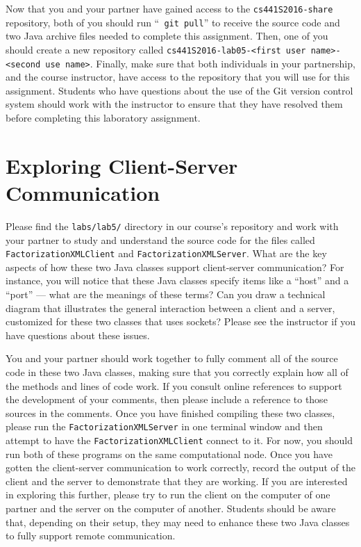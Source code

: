 Now that you and your partner have gained access to the {\tt cs441S2016-share} repository, both of you should run ``{\tt
git pull}'' to receive the source code and two Java archive files needed to complete this assignment. Then, one of you
should create a new repository called {\tt cs441S2016-lab05-<first user name>-<second use name>}. Finally, make sure
that both individuals in your partnership, and the course instructor, have access to the repository that you will use
for this assignment. Students who have questions about the use of the Git version control system should work with the
instructor to ensure that they have resolved them before completing this laboratory assignment.

\section*{Exploring Client-Server Communication}

Please find the {\tt labs/lab5/} directory in our course's repository and work with your partner to study and understand
the source code for the files called {\tt FactorizationXMLClient} and {\tt FactorizationXMLServer}. What are the
key aspects of how these two Java classes support client-server communication? For instance, you will notice that these
Java classes specify items like a ``host'' and a ``port'' --- what are the meanings of these terms? Can you draw a
technical diagram that illustrates the general interaction between a client and a server, customized for these two
classes that uses sockets? Please see the instructor if you have questions about these issues.

You and your partner should work together to fully comment all of the source code in these two Java classes, making sure
that you correctly explain how all of the methods and lines of code work. If you consult online references to support
the development of your comments, then please include a reference to those sources in the comments. Once you have
finished compiling these two classes, please run the {\tt FactorizationXMLServer} in one terminal window and then
attempt to have the {\tt FactorizationXMLClient} connect to it. For now, you should run both of these programs on the
same computational node. Once you have gotten the client-server communication to work correctly, record the output of
the client and the server to demonstrate that they are working. If you are interested in exploring this further, please
try to run the client on the computer of one partner and the server on the computer of another. Students should be aware
that, depending on their setup, they may need to enhance these two Java classes to fully support remote communication.

